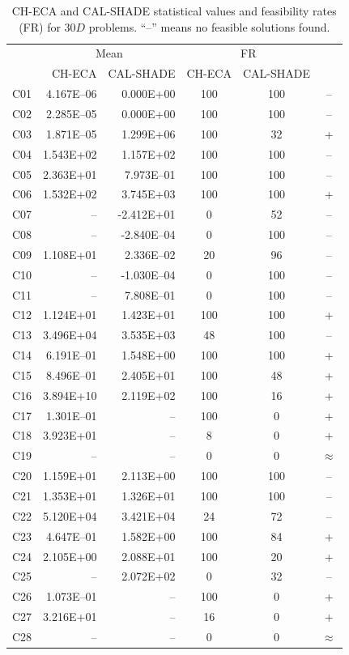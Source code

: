 \documentclass[conference]{IEEEtran}
\begin{document}
% 
% 
% 
\begin{table}[!]
	\caption{CH-ECA and CAL-SHADE statistical values and feasibility rates (FR) for $30D$ problems. ``--'' means no feasible solutions found.}
	\centering
	\begin{tabular}{|c|r|r|c|c|c|}
	 \hline
	 &\multicolumn{2}{|c|}{Mean} & \multicolumn{2}{|c|}{FR} & \\
	\cline{2-5}
	 & CH-ECA & CAL-SHADE & CH-ECA & CAL-SHADE & \\ \hline

C01 & 4.167E--06 & 0.000E+00 &  100 &  100 & -- \\ 
C02 & 2.285E--05 & 0.000E+00 &  100 &  100 & -- \\ 
C03 & 1.871E--05 & 1.299E+06 &  100 &   32 & + \\ 
C04 & 1.543E+02 & 1.157E+02 &  100 &  100 & -- \\ 
C05 & 2.363E+01 & 7.973E--01 &  100 &  100 & -- \\ 
C06 & 1.532E+02 & 3.745E+03 &  100 &  100 & + \\ 
C07 &  -- & -2.412E+01 &    0 &   52 & -- \\ 
C08 &  -- & -2.840E--04 &    0 &  100 & -- \\ 
C09 & 1.108E+01 & 2.336E--02 &   20 &   96 & -- \\ 
C10 &  -- & -1.030E--04 &    0 &  100 & -- \\ 
C11 &  -- & 7.808E--01 &    0 &  100 & -- \\ 
C12 & 1.124E+01 & 1.423E+01 &  100 &  100 & + \\ 
C13 & 3.496E+04 & 3.535E+03 &   48 &  100 & -- \\ 
C14 & 6.191E--01 & 1.548E+00 &  100 &  100 & + \\ 
C15 & 8.496E--01 & 2.405E+01 &  100 &   48 & + \\ 
C16 & 3.894E+10 & 2.119E+02 &  100 &   16 & + \\ 
C17 & 1.301E--01 &  -- &  100 &    0 & + \\ 
C18 & 3.923E+01 &  -- &    8 &    0 & + \\ 
C19 &  -- &  -- &    0 &    0 & $\approx$ \\ 
C20 & 1.159E+01 & 2.113E+00 &  100 &  100 & -- \\ 
C21 & 1.353E+01 & 1.326E+01 &  100 &  100 & -- \\ 
C22 & 5.120E+04 & 3.421E+04 &   24 &   72 & -- \\ 
C23 & 4.647E--01 & 1.582E+00 &  100 &   84 & + \\ 
C24 & 2.105E+00 & 2.088E+01 &  100 &   20 & + \\ 
C25 &  -- & 2.072E+02 &    0 &   32 & -- \\ 
C26 & 1.073E--01 &  -- &  100 &    0 & + \\ 
C27 & 3.216E+01 &  -- &   16 &    0 & + \\ 
C28 &  -- &  -- &    0 &    0 & $\approx$ \\ 
   \hline
	\end{tabular}
	\label{tab:d30c}
\end{table}
\end{document}
